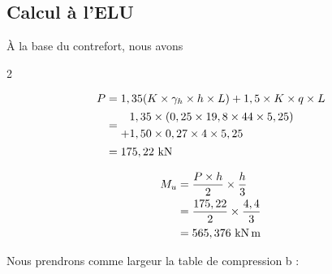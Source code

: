 \documentclass[12pt,a4paper]{report}
\begin{document}
	
	
	\subsection{Calcul à l'ELU}
	
	À la base du contrefort, nous avons
	
	\begin{multicols}{2}
		
		
		\[ \begin{aligned}
			P &= 1,35(K \times \gamma_{h} \times h \times L) + 1,5 \times K \times q \times L \\
			&=\begin{aligned}
				&1,35 \times (0,25 \times 19,8 \times 44 \times 5,25) \\
				+ &1,50 \times 0,27 \times 4 \times 5,25
			\end{aligned} \\
			&= 175,22\kn
		\end{aligned} \]
		
		\columnbreak
		
	\end{multicols}
	
	\[ 
	\begin{aligned}
		M_{u} &= \dfrac{P \times h}{2} \times \dfrac{h}{3} \\
		&= \dfrac{175,22}{2} \times \dfrac{4,4}{3} \\
		&= 565,376\knxm 
	\end{aligned}
	\]
	
	
	Nous prendrons comme largeur la table de compression b :
	
\end{document}
